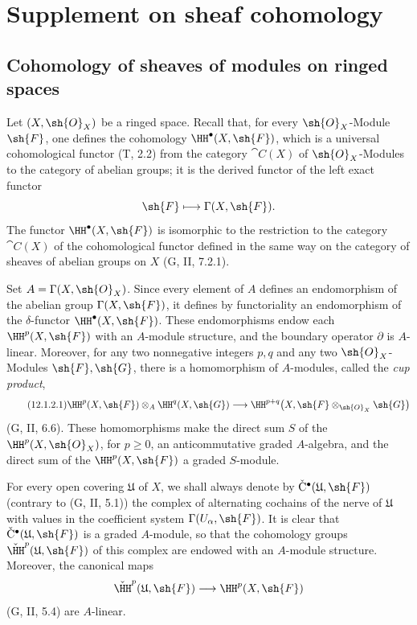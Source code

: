 \section{Supplement on sheaf cohomology}
\label{section:0.12}

\subsection{Cohomology of sheaves of modules on ringed spaces}
\label{subsection:0.12.1}

\begin{env}[12.1.1]
\label{0.12.1.1}
Let $(X,\sh{O}_X)$ be a ringed space.
Recall that, for every $\sh{O}_X$-Module $\sh{F}$, one defines the
cohomology $\HH^\bullet(X,\sh{F})$, which is a universal cohomological
functor (T, 2.2) from the category $\cat{C}(X)$ of
$\sh{O}_X$-Modules to the category of abelian groups; it is the derived
functor of the left exact functor
\[
  \sh{F}\longmapsto\Gamma(X,\sh{F}).
\]
The functor $\HH^\bullet(X,\sh{F})$ is isomorphic
to the restriction to the category $\cat{C}(X)$ of the cohomological
functor defined in the same way on the category of sheaves of abelian
groups on $X$ (G, II, 7.2.1).
\end{env}

\begin{env}[12.1.2]
\label{0.12.1.2}
Set $A=\Gamma(X,\sh{O}_X)$.
Since every element of $A$ defines an endomorphism of the abelian group
$\Gamma(X,\sh{F})$, it defines by functoriality an endomorphism of the
$\delta$-functor $\HH^\bullet(X,\sh{F})$.
These endomorphisms endow each $\HH^p(X,\sh{F})$ with an
$A$-module structure, and the boundary operator $\partial$ is
$A$-linear.
Moreover, for any two nonnegative integers $p,q$ and any two
$\sh{O}_X$-Modules $\sh{F},\sh{G}$, there is a homomorphism of
$A$-modules, called the \emph{cup product},
\[
\label{0.12.1.2.1}
\tag{12.1.2.1}
  \HH^p(X,\sh{F})\otimes_A\HH^q(X,\sh{G})
  \longrightarrow
  \HH^{p+q}\bigl(X,\sh{F}\otimes_{\sh{O}_X}\sh{G}\bigr)
\]
(G, II, 6.6).
These homomorphisms make the direct sum $S$ of the
$\HH^p(X,\sh{O}_X)$, for $p\geq0$, an anticommutative graded
$A$-algebra, and the direct sum of the $\HH^p(X,\sh{F})$ a graded
$S$-module.

For every open covering $\mathfrak{U}$ of $X$, we shall always denote
by $\check{\mathrm{C}}^\bullet(\mathfrak{U},\sh{F})$ (contrary to
(G, II, 5.1)) the complex of alternating cochains of the nerve of
$\mathfrak{U}$ with values in the coefficient system
$\Gamma(U_\alpha,\sh{F})$.
It is clear that
$\check{\mathrm{C}}^\bullet(\mathfrak{U},\sh{F})$ is a graded
$A$-module, so that the cohomology groups
$\check{\HH}^p(\mathfrak{U},\sh{F})$ of this complex are endowed with
an $A$-module structure.
Moreover, the canonical maps
\[
  \check{\HH}^p(\mathfrak{U},\sh{F})
  \longrightarrow
  \HH^p(X,\sh{F})
\]
(G, II, 5.4) are $A$-linear.
\end{env}

